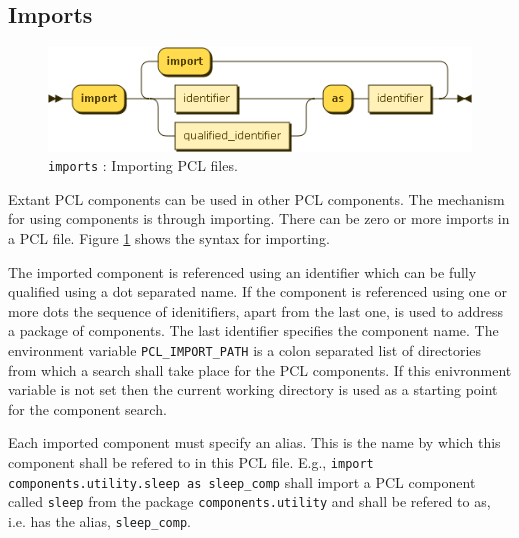 \subsection{Imports}\label{subsec:imports}
\begin{figure}[h!]
  \centering
    \includegraphics[scale=\DiagramScale]{chapters/compiler/diagrams/imports}
  \caption{\texttt{imports} : Importing PCL files.}
  \label{fig:pcl-imports}
\end{figure}
Extant PCL components can be used in other PCL components. The mechanism for using components is through importing. There can be zero or more imports in a PCL file. Figure \ref{fig:pcl-imports} shows the syntax for importing.

The imported component is referenced using an identifier which can be fully qualified using a dot separated name. If the component is referenced using one or more dots the sequence of idenitifiers, apart from the last one, is used to address a package of components. The last identifier specifies the component name. The environment variable \texttt{PCL\_IMPORT\_PATH} is a colon separated list of directories from which a search shall take place for the PCL components. If this enivronment variable is not set then the current working directory is used as a starting point for the component search.

Each imported component must specify an alias. This is the name by which this component shall be refered to in this PCL file. E.g., \texttt{import components.utility.sleep as sleep\_comp} shall import a PCL component called \texttt{sleep} from the package \texttt{components.utility} and shall be refered to as, i.e. has the alias, \texttt{sleep\_comp}.

